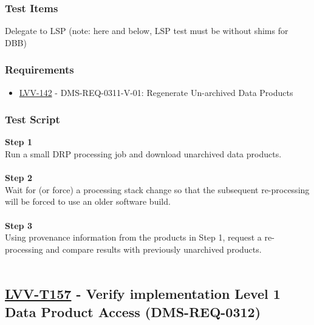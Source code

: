 \hypertarget{test-items-132}{%
\subsubsection{Test Items}\label{test-items-132}}

Delegate to LSP (note: here and below, LSP test must be without shims
for DBB)

\hypertarget{requirements-133}{%
\subsubsection{Requirements}\label{requirements-133}}

\begin{itemize}
\tightlist
\item
  \href{https://jira.lsstcorp.org/browse/LVV-142}{LVV-142} -
  DMS-REQ-0311-V-01: Regenerate Un-archived Data Products
\end{itemize}

\hypertarget{test-script-133}{%
\subsubsection{Test Script}\label{test-script-133}}

\textbf{Step 1}\\
Run a small DRP processing job and download unarchived data products.\\
~\\
\textbf{Step 2}\\
Wait for (or force) a processing stack change so that the subsequent
re-processing will be forced to use an older software build.\\
~\\
\textbf{Step 3}\\
Using provenance information from the products in Step 1, request a
re-processing and compare results with previously unarchived products.\\
~\\

\hypertarget{lvv-t157---verify-implementation-level-1-data-product-access-dms-req-0312}{%
\subsection{\texorpdfstring{\href{https://jira.lsstcorp.org/secure/Tests.jspa\#/testCase/LVV-T157}{LVV-T157}
- Verify implementation Level 1 Data Product Access
(DMS-REQ-0312)}{LVV-T157 - Verify implementation Level 1 Data Product Access (DMS-REQ-0312)}}\label{lvv-t157---verify-implementation-level-1-data-product-access-dms-req-0312}}


